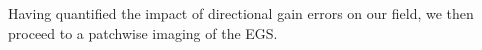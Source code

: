 \pg
Having quantified the impact of directional gain errors on our field, we then proceed to a patchwise imaging of the EGS.

%
%
%
%

